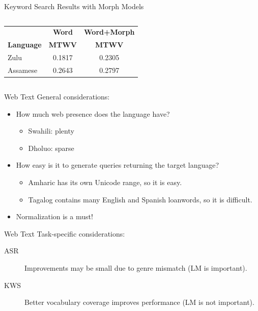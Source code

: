 \begin{frame}{Keyword Search Results with Morph Models}{}
  \begin{columns}[c]
    \column{68mm}
    \centering
    \begin{tabular}{@{}lcc@{}} \toprule
      & {\bf Word} & {\bf Word+Morph} \\
      {\bf Language} & {\bf MTWV} & {\bf MTWV} \\ \midrule
      Zulu     & 0.1817 & 0.2305 \\
      Assamese & 0.2643 & 0.2797 \\ \bottomrule
    \end{tabular}
    \column{40mm}
  \end{columns}
  \vfill
\end{frame}

\begin{frame}{Web Text}{}
  General considerations:
  \begin{itemize}
  \item How much web presence does the language have?
    \begin{itemize}
    \item Swahili: plenty
    \item Dholuo: sparse
    \end{itemize}
  \item How easy is it to generate queries returning the target language?
    \begin{itemize}
    \item Amharic has its own Unicode range, so it is easy.
    \item Tagalog contains many English and Spanish loanwords, so it
      is difficult.
    \end{itemize}
  \item Normalization is a must!
  \end{itemize}
\end{frame}

\begin{frame}{Web Text}{}
  Task-specific considerations:
  \begin{description}
  \item[ASR] Improvements may be small due to genre mismatch (LM is important).
  \item[KWS] Better vocabulary coverage improves performance (LM is not important).
  \end{description}
\end{frame}

